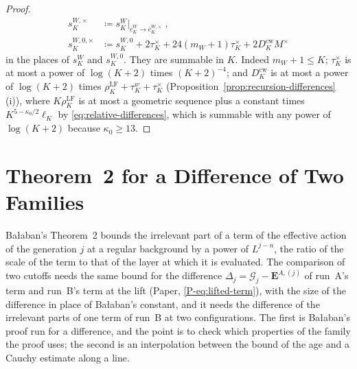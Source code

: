 \documentclass[11pt]{preprint}
\numberwithin{equation}{section}
\theoremstyle{definition}
\theoremstyle{remark}
\theoremstyle{plain}
\begin{document}
\begin{proof}
\begin{equation}\label{eq:dressing-rates-cross}
\begin{aligned}
    s^{W,\times}_K &\coloneqq s^W_K\big|_{\bar c^W_K \to \bar c^{W,\times}_K}\;,\\
    s^{W,0,\times}_K &\coloneqq s^{W,0}_K + 2\tau^\times_K + 24(m_W + 1)\tau^\times_K + 2D^{\mathrm{cw}}_KM^\times
\end{aligned}
\end{equation}
in the places of $s^W_K$ and $s^{W,0}_K$. They are summable in $K$. Indeed $m_W + 1 \leq K$; $\tau^\times_K$ is at most a power of $\log(K + 2)$ times $(K + 2)^{-4}$; and $D^{\mathrm{cw}}_K$ is at most a power of $\log(K + 2)$ times $\rho^{\mathrm{LF}}_K + \tau^w_K + \tau^\times_K$ (Proposition~\ref{prop:recursion-differences}(i)), where $K\rho^{\mathrm{LF}}_K$ is at most a geometric sequence plus a constant times $K^{5-\kappa_0/2}\ell_K$ by \eqref{eq:relative-differences}, which is summable with any power of $\log(K + 2)$ because $\kappa_0 \geq 13$.
\end{proof}

\section{Theorem~2 for a Difference of Two Families}\label{sec:theorem-two-difference}

Ba{\l}aban's Theorem~2 \cite[(2.43), p.~263]{BalabanCRE} bounds the irrelevant part of a term of the effective action of the generation $j$ at a regular background by a power of $L^{j-n}$, the ratio of the scale of the term to that of the layer at which it is evaluated. The comparison of two cutoffs needs the same bound for the difference $\Delta_j = \mathcal G_j - \mathbf E^{A,(j)}$ of run~A's term and run~B's term at the lift (Paper, \eqref{P-eq:lifted-term}), with the size of the difference in place of Ba{\l}aban's constant, and it needs the difference of the irrelevant parts of one term of run~B at two configurations. The first is Ba{\l}aban's proof run for a difference, and the point is to check which properties of the family the proof uses; the second is an interpolation between the bound of the age and a Cauchy estimate along a line.
\end{document}

